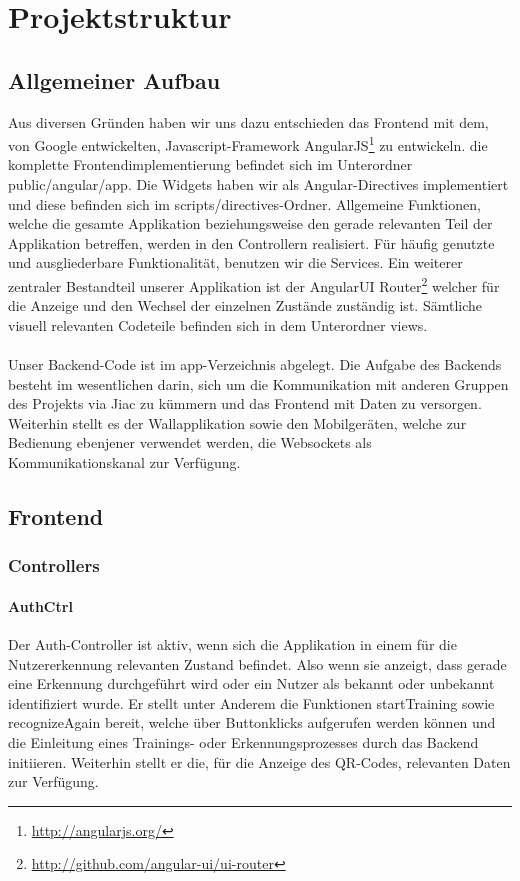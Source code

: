 \documentclass[10pt,a4paper]{report}
\newcommand{\code}[1]{{\fontfamily{cmvtt}\selectfont #1}}
\begin{document}
	\section{Projektstruktur}
		\subsection{Allgemeiner Aufbau}
			Aus diversen Gründen haben wir uns dazu entschieden das Frontend mit dem, von Google entwickelten, Javascript-Framework AngularJS\footnote{\href{http://angularjs.org/}{http://angularjs.org/}} zu entwickeln. die komplette Frontendimplementierung befindet sich im Unterordner \code{public/angular/app}. Die Widgets haben wir als Angular-Directives implementiert und diese befinden sich im \code{scripts/directives}-Ordner. Allgemeine Funktionen, welche die gesamte Applikation beziehungsweise den gerade relevanten Teil der Applikation betreffen, werden in den Controllern realisiert. Für häufig genutzte und ausgliederbare Funktionalität, benutzen wir die Services. Ein weiterer zentraler Bestandteil unserer Applikation ist der AngularUI Router\footnote{\href{http://github.com/angular-ui/ui-router}{http://github.com/angular-ui/ui-router}} welcher für die Anzeige und den Wechsel der einzelnen Zustände zuständig ist. Sämtliche visuell relevanten Codeteile befinden sich in dem Unterordner \code{views}.\\\\
			Unser Backend-Code ist im \code{app}-Verzeichnis abgelegt. Die Aufgabe des Backends  besteht im wesentlichen darin, sich um die Kommunikation mit anderen Gruppen des Projekts via Jiac zu kümmern und das Frontend mit Daten zu versorgen. Weiterhin stellt es der Wallapplikation sowie den Mobilgeräten, welche zur Bedienung ebenjener verwendet werden, die Websockets als Kommunikationskanal zur Verfügung.

		\subsection{Frontend}
			\subsubsection{Controllers}
				\paragraph{AuthCtrl}
					Der Auth-Controller ist aktiv, wenn sich die Applikation in einem für die Nutzererkennung relevanten Zustand befindet. Also wenn sie anzeigt, dass gerade eine Erkennung durchgeführt wird oder ein Nutzer als bekannt oder unbekannt identifiziert wurde. Er stellt unter Anderem die Funktionen \code{startTraining} sowie \code{recognizeAgain} bereit, welche über Buttonklicks aufgerufen werden können und die Einleitung eines Trainings- oder Erkennungsprozesses durch das Backend initiieren. Weiterhin stellt er die, für die Anzeige des QR-Codes, relevanten Daten zur Verfügung.
\end{document}
